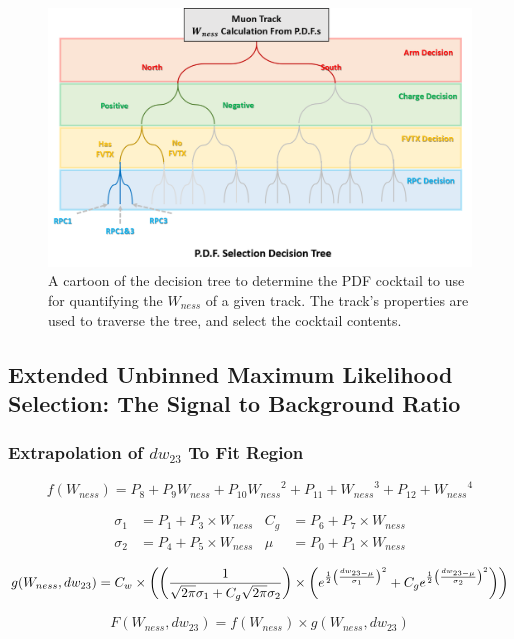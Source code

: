 \begin{figure}[ht]
  \centering
  \includegraphics[width=\linewidth]{./figures/pdf_selection_tree.png}
  \caption{
    A cartoon of the decision tree to determine the PDF cocktail to use for
    quantifying the $W_{ness}$ of a given track. The track's properties are used
    to traverse the tree, and select the cocktail contents.
  }
  \label{fig:pdf_selection_tree}
\end{figure}

\clearpage
\subsection{Extended Unbinned Maximum Likelihood Selection: The Signal to
Background Ratio}
\label{sec:sbr}

\subsubsection{Extrapolation of $dw_{23}$ To Fit Region}

\begin{equation} \label{eq:dw23_wness_part}
  f(W_{ness}) = 
  P_8 + P_9 W_{ness} + 
  P_{10} {W_{ness}}^2 +
  P_{11} + {W_{ness}}^3 +
  P_{12} + {W_{ness}}^4
\end{equation}

\begin{align}\label{eq_dw23_equations}
  \sigma_1 &= P_1 + P_3 \times W_{ness} &  C_g &= P_6 + P_7 \times W_{ness} \\
  \sigma_2 &= P_4 + P_5 \times W_{ness} &  \mu &= P_0 + P_1 \times W_{ness}
\end{align}

\begin{equation}
  g(W_{ness},dw_{23}) = C_w \times 
  \left(
    \left( 
      { {1}\over{\sqrt{2\pi}\sigma_1+C_g\sqrt{2\pi}\sigma_2} }
    \right) 
    \times
    \left(
      e^{{{1}\over{2}}{\left({dw_{23-\mu}}\over{\sigma_1}\right)^2}}
        +C_ge^{{{1}\over{2}}{\left({dw_{23-\mu}}\over{\sigma_2}\right)^2}} 
    \right) 
  \right)
  \label{eq:dw23_parameterization}
\end{equation}

\begin{equation}
  F(W_{ness},dw_{23}) = f(W_{ness})\times g(W_{ness},dw_{23}) 
  \label{eq:dw23_final_parameterization}
\end{equation}

